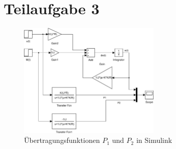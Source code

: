 \section{Teilaufgabe 3}
\begin{figure}[h!]
    \centering
    \includegraphics[width=0.6\textwidth]{03/transfer.pdf}
    \caption{Übertragungsfunktionen $P_1$ und $P_2$ in Simulink}
    \label{fig:03}
\end{figure}
